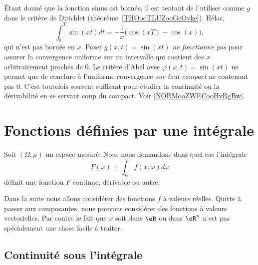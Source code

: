 \begin{remark}
	Étant donné que la fonction sinus est bornée, il est tentant de l'utiliser comme \( g\) dans le critère de Dirichlet (théorème~\ref{THOooTLUZooGeOvke}). Hélas,
	\begin{equation}
		\int_0^T\sin(xt)dt=-\frac{ 1 }{ x }\big( \cos(xT)-\cos(x) \big),
	\end{equation}
	qui n'est pas bornée en \( x\). Poser \( g(x,t)=\sin(xt)\) \emph{ne fonctionne pas} pour assurer la convergence uniforme sur un intervalle qui contient des \( x\) arbitrairement proches de \( 0\). Le critère d'Abel avec \( \varphi(x,t)=\sin(xt)\) ne permet que de conclure à l'uniforme convergence \emph{sur tout compact} ne contenant pas \( 0\). C'est toutefois souvent suffisant pour étudier la continuité ou la dérivabilité en se servant coup du compact. Voir \ref{NORMooZWECooHvRgBw}.
\end{remark}

\section{Fonctions définies par une intégrale}
\label{SecCHwnBDj}

Soit \( (\Omega,\mu)\) un espace mesuré. Nous nous demandons dans quel cas l'intégrale
\begin{equation}
	F(x)=\int_{\Omega}f(x,\omega)d\omega
\end{equation}
définit une fonction \( F\) continue, dérivable ou autre.

Dans la suite nous allons considérer des fonctions \( f\) à valeurs réelles. Quitte à passer aux composantes, nous pouvons considérer des fonctions à valeurs vectorielles. Par contre le fait que \( x\) soit dans \( \eR\) ou dans \( \eR^n\) n'est pas spécialement une chose facile à traiter.

\subsection{Continuité sous l'intégrale}

